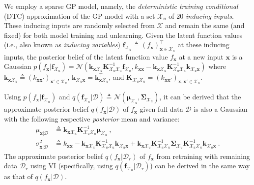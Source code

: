 \documentclass{article}
\theoremstyle{definition}
\newcommand{\mbf}[1]{\mathbf{#1}}
\newcommand{\mcl}[1]{\mathcal{#1}}
\newcommand{\da}{\mcl{D}}
\newcommand{\dc}{\mcl{D}_r}
\begin{document}
We employ a sparse GP model, namely, the \emph{deterministic training conditional} (DTC) \cite{quinonero2005unifying} approximation of the GP model with a set $\mcl{X}_u$ of $20$ \emph{inducing inputs}. These inducing inputs are randomly selected from $\mcl{X}$ and remain the same (and fixed) for both model training and unlearning. Given the latent function values (i.e., also known as \emph{inducing variables}) $\mbf{f}_{\mcl{X}_u} \triangleq (f_{\mbf{x}})^{\top}_{\mbf{x} \in \mcl{X}_u}$ at these inducing inputs, the posterior belief of the latent function value $f_{\mbf{x}}$ at a new input $\mbf{x}$ is a Gaussian $p(f_{\mbf{x}}|\mbf{f}_{\mcl{X}_u}) = \mcl{N}(\mbf{k}_{\mbf{x} \mcl{X}_u} \mbf{K}_{\mcl{X}_u\mcl{X}_u}^{-1} \mbf{f}_{\mcl{X}_u}, k_{\mbf{x} \mbf{x}} - \mbf{k}_{\mbf{x} \mcl{X}_u} \mbf{K}_{\mcl{X}_u\mcl{X}_u}^{-1} \mbf{k}_{\mcl{X}_u \mbf{x}})$
%
%
where $\mbf{k}_{\mbf{x} \mcl{X}_u} \triangleq (k_{\mbf{x}\mbf{x}'})_{\mbf{x}' \in \mcl{X}_u}$, $\mbf{k}_{\mcl{X}_u \mbf{x}} = \mbf{k}_{\mbf{x} \mcl{X}_u}^\top$, and $\mbf{K}_{\mcl{X}_u\mcl{X}_u} = (k_{\mbf{x} \mbf{x}'})_{\mbf{x}, \mbf{x}' \in \mcl{X}_u}$.

Using $p(f_{\mbf{x}}|\mbf{f}_{\mcl{X}_u})$ and $q(\mbf{f}_{\mcl{X}_u}| \da) \triangleq \mcl{N}(\bm{\mu}_{\mcl{X}_u}, \bm{\Sigma}_{\mcl{X}_u})$, it can be derived that 
the approximate posterior belief $q(f_{\mbf{x}}| \da)$ of $f_{\mbf{x}}$ given full data $\da$
is also a Gaussian with the following respective \emph{posterior} mean and variance:
%
\begin{align}
\mu_{\mbf{x}|\da} &\triangleq \mbf{k}_{\mbf{x} \mcl{X}_u} \mbf{K}_{\mcl{X}_u\mcl{X}_u}^{-1} \bm{\mu}_{\mcl{X}_u}\ ,\label{eq:gppostmean}\\
\sigma_{\mbf{x}|\da}^2 &\triangleq k_{\mbf{x} \mbf{x}} - \mbf{k}_{\mbf{x} \mcl{X}_u} \mbf{K}_{\mcl{X}_u\mcl{X}_u}^{-1} \mbf{k}_{\mcl{X}_u \mbf{x}} + \mbf{k}_{\mbf{x} \mcl{X}_u} \mbf{K}_{\mcl{X}_u\mcl{X}_u}^{-1} \bm{\Sigma}_{\mcl{X}_u} \mbf{K}_{\mcl{X}_u\mcl{X}_u}^{-1} \mbf{k}_{\mcl{X}_u \mbf{x}}\ .\label{eq:gppostvar}
\end{align}
%
The approximate posterior belief $q(f_{\mbf{x}}| \dc)$ of $f_{\mbf{x}}$ from retraining with remaining data $\dc$  using VI (specifically, using $q(\mbf{f}_{\mcl{X}_u}| \dc)$) can be derived in the same way as that of $q(f_{\mbf{x}}| \da)$.
\end{document}
